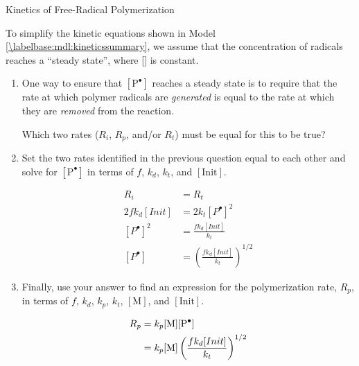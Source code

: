 \begin{activity}{Kinetics of Free-Radical Polymerization}
\begin{ctqs}
\begin{enumerate}
		\end{enumerate}

	\question To simplify the kinetic equations shown in Model \ref{\labelbase:mdl:kineticssummary}, we assume that the concentration of radicals reaches a ``steady state'', where [] is constant.
	
		\begin{enumerate}
			\item One way to ensure that $[\text{P}^{\bullet}]$ reaches a steady state is to require that the rate at which polymer radicals are \emph{generated} is equal to the rate at which they are \emph{removed} from the reaction.
			
				Which two rates ($R_i$, $R_p$, and/or $R_t$) must be equal for this to be true?
				
				\begin{solution}[0.75in]
				\end{solution}
				
			\item Set the two rates identified in the previous question equal to each other and solve for $[\text{P}^{\bullet}]$ in terms of $f$, $k_d$, $k_t$, and $[\text{Init}]$.
			
				\begin{solution}[2in]
					\begin{align*}
						R_i &= R_t \\
						2fk_d[Init] &= 2k_t[P^\bullet]^2\\
						[P^\bullet]^2 &= \frac{fk_d[Init]}{k_t}\\
						[P^\bullet] &= \left(\frac{fk_d[Init]}{k_t}\right)^{1/2}
					\end{align*}
				\end{solution}
			
			\item Finally, use your answer to find an expression for the polymerization rate, $R_p$, in terms of $f$, $k_d$, $k_p$, $k_t$, $[\text{M}]$, and $[\text{Init}]$.
			
				\begin{solution}[1.5in]
					\begin{align*}
						R_p &= k_p\text{[M][\ce{P^.}]}\\
						&= k_p\text{[M]}\left(\frac{fk_d[Init]}{k_t}\right)^{1/2}
					\end{align*}
				\end{solution}
			
		\end{enumerate}
	

\end{ctqs}
\end{activity}
